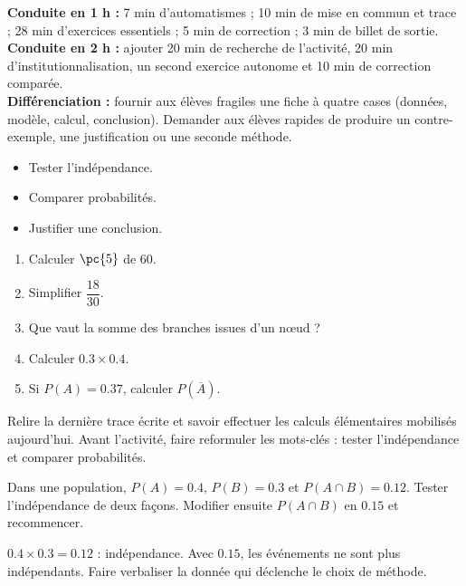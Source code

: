     \ifmxteacher
    \begin{method}
    \textbf{Conduite en 1 h :} 7 min d'automatismes ; 10 min de mise en commun et trace ; 28 min d'exercices essentiels ; 5 min de correction ; 3 min de billet de sortie.\\
    \textbf{Conduite en 2 h :} ajouter 20 min de recherche de l'activité, 20 min d'institutionnalisation, un second exercice autonome et 10 min de correction comparée.\\
    \textbf{Différenciation :} fournir aux élèves fragiles une fiche à quatre cases (données, modèle, calcul, conclusion). Demander aux élèves rapides de produire un contre-exemple, une justification ou une seconde méthode.
    \end{method}
    \fi
{}
\begin{objectives}\begin{itemize}\item Tester l'indépendance.\item Comparer probabilités.\item Justifier une conclusion.\end{itemize}\end{objectives}
\begin{fluency}\begin{enumerate}\item Calculer $\pc{5}$ de $60$. \item Simplifier $\dfrac{18}{30}$. \item Que vaut la somme des branches issues d'un nœud ? \item Calculer $\num{0,3}\times\num{0,4}$. \item Si $P(A)=\num{0,37}$, calculer $P(\overline A)$. \end{enumerate}\end{fluency}
\begin{prerequisites}Relire la dernière trace écrite et savoir effectuer les calculs élémentaires mobilisés aujourd'hui. Avant l'activité, faire reformuler les mots-clés : tester l'indépendance et comparer probabilités.\end{prerequisites}

\begin{activity}
Dans une population, $P(A)=\num{0,4}$, $P(B)=\num{0,3}$ et $P(A\cap B)=\num{0,12}$. Tester l'indépendance de deux façons. Modifier ensuite $P(A\cap B)$ en $\num{0,15}$ et recommencer.

\end{activity}
\begin{solution}$\num{0,4}\times\num{0,3}=\num{0,12}$ : indépendance. Avec $\num{0,15}$, les événements ne sont plus indépendants. Faire verbaliser la donnée qui déclenche le choix de méthode.\end{solution}

